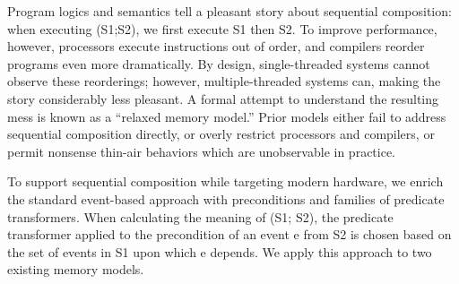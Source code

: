 Program logics and semantics tell a pleasant story about sequential composition: when executing (S1;S2), we first execute S1 then S2. To improve performance, however, processors execute instructions out of order, and compilers reorder programs even more dramatically. By design, single-threaded systems cannot observe these reorderings; however, multiple-threaded systems can, making the story considerably less pleasant. A formal attempt to understand the resulting mess is known as a “relaxed memory model.” Prior models either fail to address sequential composition directly, or overly restrict processors and compilers, or permit nonsense thin-air behaviors which are unobservable in practice.

To support sequential composition while targeting modern hardware, we enrich the standard event-based approach with preconditions and families of predicate transformers. When calculating the meaning of (S1; S2), the predicate transformer applied to the precondition of an event e from S2 is chosen based on the set of events in S1 upon which e depends. We apply this approach to two existing memory models.